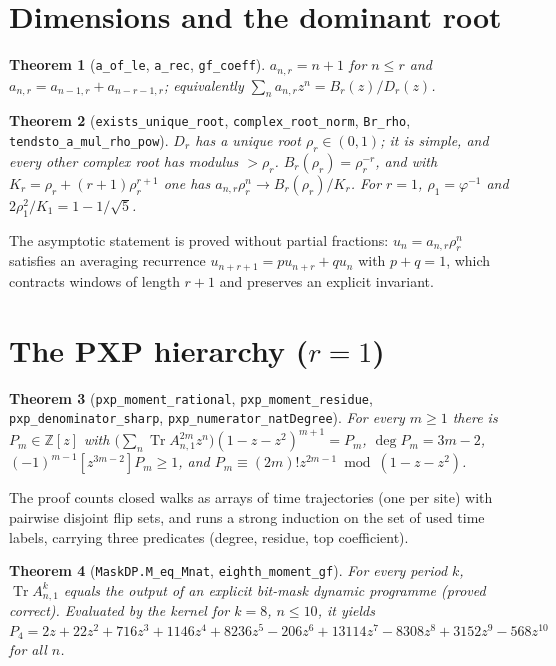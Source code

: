 \documentclass[11pt]{article}
\newtheorem{theorem}{Theorem}
\theoremstyle{remark}\newtheorem{remark}[theorem]{Remark}
\begin{document}
\section{Dimensions and the dominant root}
\begin{theorem}[\texttt{a\_of\_le}, \texttt{a\_rec}, \texttt{gf\_coeff}]
$a_{n,r}=n+1$ for $n\le r$ and $a_{n,r}=a_{n-1,r}+a_{n-r-1,r}$; equivalently $\sum_n a_{n,r}z^n=B_r(z)/D_r(z)$.
\end{theorem}
\begin{theorem}[\texttt{exists\_unique\_root}, \texttt{complex\_root\_norm}, \texttt{Br\_rho}, \texttt{tendsto\_a\_mul\_rho\_pow}]
$D_r$ has a unique root $\rho_r\in(0,1)$; it is simple, and every other complex root has modulus $>\rho_r$.
$B_r(\rho_r)=\rho_r^{-r}$, and with $K_r=\rho_r+(r+1)\rho_r^{r+1}$ one has $a_{n,r}\rho_r^n\to B_r(\rho_r)/K_r$.
For $r=1$, $\rho_1=\varphi^{-1}$ and $2\rho_1^2/K_1=1-1/\sqrt5$.
\end{theorem}
The asymptotic statement is proved without partial fractions: $u_n=a_{n,r}\rho_r^n$ satisfies an averaging recurrence $u_{n+r+1}=pu_{n+r}+qu_n$ with $p+q=1$, which contracts windows of length $r+1$ and preserves an explicit invariant.

\section{The PXP hierarchy ($r=1$)}
\begin{theorem}[\texttt{pxp\_moment\_rational}, \texttt{pxp\_moment\_residue}, \texttt{pxp\_denominator\_sharp}, \texttt{pxp\_numerator\_natDegree}]
For every $m\ge1$ there is $P_m\in\mathbb Z[z]$ with $\bigl(\sum_n\operatorname{Tr}A_{n,1}^{2m}z^n\bigr)(1-z-z^2)^{m+1}=P_m$, $\deg P_m=3m-2$, $(-1)^{m-1}[z^{3m-2}]P_m\ge1$, and $P_m\equiv(2m)!z^{2m-1}\bmod(1-z-z^2)$.
\end{theorem}
The proof counts closed walks as arrays of time trajectories (one per site) with pairwise disjoint flip sets, and runs a strong induction on the set of used time labels, carrying three predicates (degree, residue, top coefficient).
\begin{theorem}[\texttt{MaskDP.M\_eq\_Mnat}, \texttt{eighth\_moment\_gf}]
For every period $k$, $\operatorname{Tr}A_{n,1}^k$ equals the output of an explicit bit-mask dynamic programme (proved correct). Evaluated by the kernel for $k=8$, $n\le10$, it yields
$P_4=2z+22z^2+716z^3+1146z^4+8236z^5-206z^6+13114z^7-8308z^8+3152z^9-568z^{10}$ for all $n$.
\end{theorem}
\end{document}
